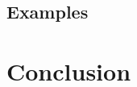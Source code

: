 \documentclass[fleqn, abstract=on]{scrreprt}
\newcommand{\todo}[1]{\marginpar{\textbf{TODO:} #1}}
\begin{document}
\section{Examples}
\chapter{Conclusion}

\appendix



\end{document}
